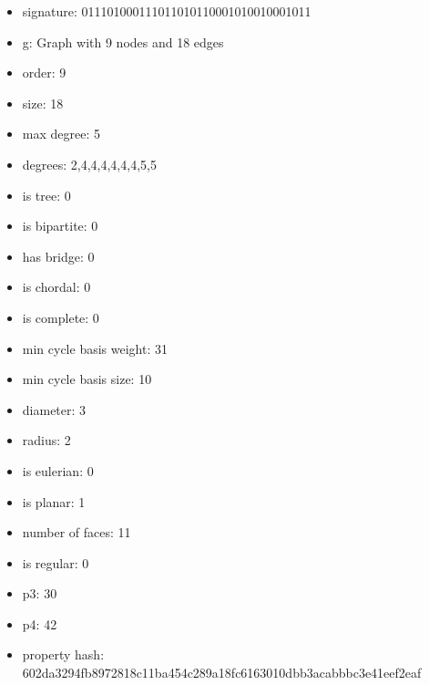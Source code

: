 \newpage
\begin{figure}
\end{figure}
\begin{itemize}
\item signature: 011101000111011010110001010010001011
\item g: Graph with 9 nodes and 18 edges
\item order: 9
\item size: 18
\item max degree: 5
\item degrees: 2,4,4,4,4,4,4,5,5
\item is tree: 0
\item is bipartite: 0
\item has bridge: 0
\item is chordal: 0
\item is complete: 0
\item min cycle basis weight: 31
\item min cycle basis size: 10
\item diameter: 3
\item radius: 2
\item is eulerian: 0
\item is planar: 1
\item number of faces: 11
\item is regular: 0
\item p3: 30
\item p4: 42
\item property hash: 602da3294fb8972818c11ba454c289a18fc6163010dbb3acabbbc3e41eef2eaf
\end{itemize}
